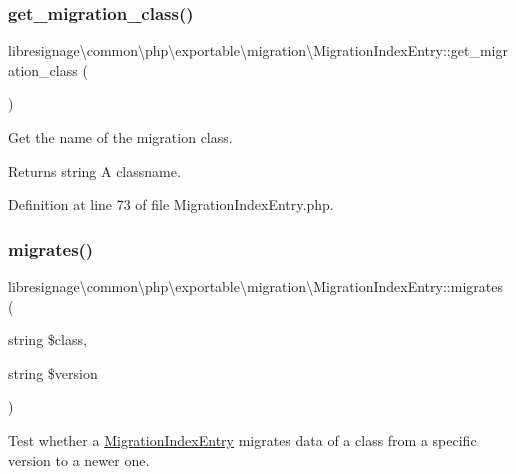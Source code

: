 \subsubsection{\texorpdfstring{get\+\_\+migration\+\_\+class()}{get\_migration\_class()}}
{\footnotesize\ttfamily libresignage\textbackslash{}common\textbackslash{}php\textbackslash{}exportable\textbackslash{}migration\textbackslash{}\+Migration\+Index\+Entry\+::get\+\_\+migration\+\_\+class (\begin{DoxyParamCaption}{ }\end{DoxyParamCaption})}

Get the name of the migration class.

\begin{DoxyReturn}{Returns}
string A classname. 
\end{DoxyReturn}


Definition at line 73 of file Migration\+Index\+Entry.\+php.

\mbox{\label{classlibresignage_1_1common_1_1php_1_1exportable_1_1migration_1_1MigrationIndexEntry_afae7a2b1d87620cdd3cc91bd4466d764}} 
\subsubsection{\texorpdfstring{migrates()}{migrates()}}
{\footnotesize\ttfamily libresignage\textbackslash{}common\textbackslash{}php\textbackslash{}exportable\textbackslash{}migration\textbackslash{}\+Migration\+Index\+Entry\+::migrates (\begin{DoxyParamCaption}\item[{string}]{\$class,  }\item[{string}]{\$version }\end{DoxyParamCaption})}

Test whether a \hyperlink{classlibresignage_1_1common_1_1php_1_1exportable_1_1migration_1_1MigrationIndexEntry}{Migration\+Index\+Entry} migrates data of a class from a specific version to a newer one.


